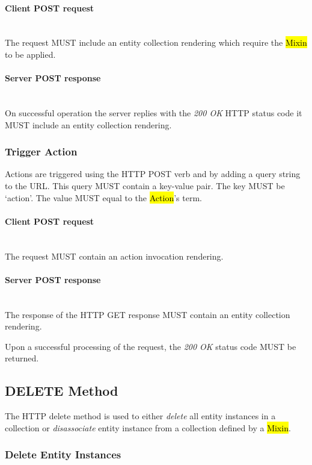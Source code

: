 \documentclass[10pt,a4paper]{article}
\begin{document}
\paragraph*{Client POST request}\hfill\\
The request MUST include an entity collection rendering which require the \hl{Mixin} to be applied.

\paragraph*{Server POST response}\hfill\\
On successful operation the server replies with the \emph{200 OK} HTTP status code it MUST include an entity collection rendering.

\subsubsection{Trigger Action}
Actions are triggered using the HTTP POST verb and by adding a query string to the URL.
This query MUST contain a key-value pair. The key MUST be `action'. The value MUST
equal to the \hl{Action}'s term.

\paragraph*{Client POST request}\hfill\\
The request MUST contain an action invocation rendering.

\paragraph*{Server POST response}\hfill\\
The response of the HTTP GET response MUST contain an entity collection rendering.

Upon a successful processing of the request, the \emph{200 OK} status code MUST be returned.

\subsection{DELETE Method}
The HTTP delete method is used to either {\em delete} all entity instances in
a collection or {\em disassociate} entity instance from a collection defined
by a \hl{Mixin}.

\subsubsection{Delete Entity Instances}
\end{document}

